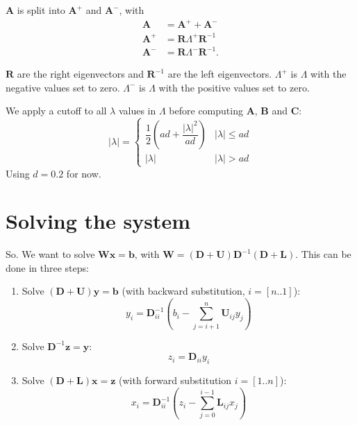 \documentclass[12pt]{article}
\begin{document}
$\bm{A}$ is split into $\bm{A}^+$ and ${\bm{A}^-}$, with
\begin{subequations}\label{eq:fj_split}
\begin{align}
    \bm{A}   &= \bm{A}^+ + \bm{A}^- \\
    \bm{A}^+ &= \bm{R} \Lambda^+ \bm{R}^{-1} \\
    \bm{A}^- &= \bm{R} \Lambda^- \bm{R}^{-1}.
\end{align}
\end{subequations}

$\bm{R}$ are the right eigenvectors and $\bm{R}^{-1}$ are the left eigenvectors.
$\Lambda^+$ is $\Lambda$ with the negative values set to zero. $\Lambda^-$ is $\Lambda$ with the positive values set to zero.

We apply a cutoff to all $\lambda$ values in $\Lambda$ before computing $\bm{A}$, $\bm{B}$ and $\bm{C}$:
\begin{equation}
    |\lambda| = \left\{\begin{matrix}
        \dfrac{1}{2}\left(ad + \dfrac{|\lambda|^2}{ad}\right) & |\lambda| \le ad \\
        |\lambda| & |\lambda| > ad
    \end{matrix}\right.
\end{equation}
Using $d = 0.2$ for now.


\section{Solving the system}

So. We want to solve $\bm{Wx} = \bm{b}$, with
$\bm{W} = (\bm{D} + \bm{U}) \bm{D}^{-1} (\bm{D} + \bm{L})$. This can be done in three steps:
\begin{enumerate}
\item Solve $ (\bm{D} + \bm{U}) \bm{y} = \bm{b} $ (with backward substitution, $i = [n..1]$):
    \begin{equation}\label{eq:backward_step}
        y_i = \bm{D}_{ii}^{-1} \left( b_i - \sum_{j=i+1}^{n} \bm{U}_{ij} y_j \right)
    \end{equation}
\item Solve $ \bm{D}^{-1} \bm{z} = \bm{y} $:
    \begin{equation}\label{eq:diagonal_step}
        z_i = \bm{D}_{ii} y_i
    \end{equation}
\item Solve $ (\bm{D} + \bm{L}) \bm{x} = \bm{z} $ (with forward substitution $i = [1..n]$):
    \begin{equation}\label{eq:forward_step}
        x_i = \bm{D}_{ii}^{-1} \left( z_i - \sum_{j=0}^{i-1} \bm{L}_{ij} x_j \right)
    \end{equation}
\end{enumerate}
\end{document}
